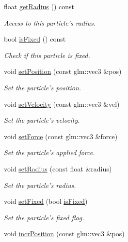\begin{DoxyCompactItemize}
float \hyperlink{classParticle_a34b87163953d21f8ba23f960a7927e52}{get\+Radius} () const 
\begin{DoxyCompactList}\small\item\em Access to this particle's radius. \end{DoxyCompactList}\item 
bool \hyperlink{classParticle_a9d41e6acd3b52ff439b3a4903f630fcd}{is\+Fixed} () const 
\begin{DoxyCompactList}\small\item\em Check if this particle is fixed. \end{DoxyCompactList}\item 
void \hyperlink{classParticle_aee41362c732ae8a7cca20d872e5a3fc1}{set\+Position} (const glm\+::vec3 \&pos)
\begin{DoxyCompactList}\small\item\em Set the particle's position. \end{DoxyCompactList}\item 
void \hyperlink{classParticle_acbab01a9093288cdd1242b24e5de80a9}{set\+Velocity} (const glm\+::vec3 \&vel)
\begin{DoxyCompactList}\small\item\em Set the particle's velocity. \end{DoxyCompactList}\item 
void \hyperlink{classParticle_af07a51b823e3570623e2b6fcd43d01df}{set\+Force} (const glm\+::vec3 \&force)
\begin{DoxyCompactList}\small\item\em Set the particle's applied force. \end{DoxyCompactList}\item 
void \hyperlink{classParticle_a03c5c0de979488aa04f2541637945eea}{set\+Radius} (const float \&radius)
\begin{DoxyCompactList}\small\item\em Set the particle's radius. \end{DoxyCompactList}\item 
void \hyperlink{classParticle_a81e84b1b27570a749bd92a309dc12f25}{set\+Fixed} (bool \hyperlink{classParticle_a9d41e6acd3b52ff439b3a4903f630fcd}{is\+Fixed})
\begin{DoxyCompactList}\small\item\em Set the particle's fixed flag. \end{DoxyCompactList}\item 
void \hyperlink{classParticle_aaa74f8dfdb197454efb785f59393719c}{incr\+Position} (const glm\+::vec3 \&pos)

\end{DoxyCompactItemize}
